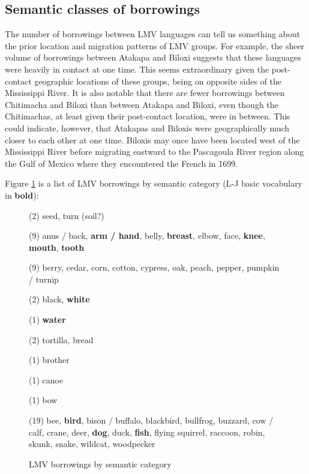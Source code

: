 \documentclass[output=paper]{LSP/langsci}
\begin{document}
\subsection{Semantic classes of borrowings}
	
	The number of borrowings between LMV languages can tell us something about the prior location and migration patterns of LMV groups. For example, the sheer volume of borrowings between Atakapa and Biloxi suggests that these languages were heavily in contact at one time. This seems extraordinary given the post-contact geographic locations of these groups, being on opposite sides of the Mississippi River. It is also notable that there are fewer borrowings between Chitimacha and Biloxi than between Atakapa and Biloxi, even though the Chitimachas, at least given their post-contact location, were in between. This could indicate, however, that Atakapas and Biloxis were geographically much closer to each other at one time. Biloxis may once have been located west of the Mississippi River before migrating eastward to the Pascagoula River region along the Gulf of Mexico where they encountered the French in 1699.

	Figure \ref{LMVloans} is a list of LMV borrowings by semantic category (L-J basic vocabulary in \textbf{bold}): 

\begin{figure}[]
\caption{LMV borrowings by semantic category}
\begin{description} \itemsep1pt \parskip0pt 
\item[Agricultural:] (2) seed, turn (soil?)
\item[Body parts:] (9) anus / back, \textbf{arm / hand}, belly, \textbf{breast}, elbow, face, \textbf{knee}, \textbf{mouth}, \textbf{tooth}
\item[Botanical:] (9) berry, cedar, corn, cotton, cypress, oak, peach, pepper, pumpkin / turnip
\item[Color:] (2) black, \textbf{white}
\item[Drink:] (1) \textbf{water}
\item[Food:] (2) tortilla, bread
\item[Kin:] (1) brother
\item[Transport:] (1) canoe
\item[Weapon:] (1) bow
\item[Zoological:] (19) bee, \textbf{bird}, bison / buffalo, blackbird, bullfrog, buzzard, cow / calf, crane, deer, \textbf{dog}, duck, \textbf{fish}, flying squirrel, raccoon, robin, skunk, snake, wildcat, woodpecker
\end{description}
\label{LMVloans}
\end{figure}
\end{document}
